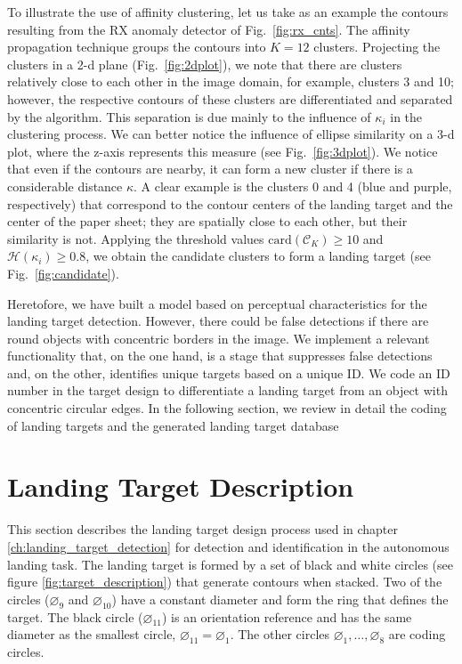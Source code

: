 To illustrate the use of affinity clustering, let us take as an example the contours resulting from the RX anomaly detector of Fig.\ \ref{fig:rx_cnts}. The affinity propagation technique groups the contours into $K=12$ clusters. Projecting the clusters in a 2-d plane (Fig.\ \ref{fig:2dplot}), we note that there are clusters relatively close to each other in the image domain, for example, clusters 3 and 10; however, the respective contours of these clusters are differentiated and separated by the algorithm. This separation is due mainly to the influence of $\kappa_{i}$ in the clustering process. We can better notice the influence of ellipse similarity on a 3-d plot, where the z-axis represents this measure (see Fig.\ \ref{fig:3dplot}). We notice that even if the contours are nearby, it can form a new cluster if there is a considerable distance $\kappa$. A clear example is the clusters 0 and 4 (blue and purple, respectively) that correspond to the contour centers of the landing target and the center of the paper sheet; they are spatially close to each other, but their similarity is not. Applying the threshold values $\mathrm{card}(\mathcal{C}_{K})\geq 10$ and $\mathcal{H}(\kappa_{i})\geq 0.8$, we obtain the candidate clusters to form a landing target (see Fig.\ \ref{fig:candidate}). 

Heretofore, we have built a model based on perceptual characteristics for the landing target detection. However, there could be false detections if there are round objects with concentric borders in the image. We implement a relevant functionality that, on the one hand, is a stage that suppresses false detections and, on the other, identifies unique targets based on a unique ID. We code an ID number in the target design to differentiate a landing target from an object with concentric circular edges. In the following section, we review in detail the coding of landing targets and the generated landing target database

\section{Landing Target Description}\label{ch:target_description}
This section describes the landing target design process used in chapter \ref{ch:landing_target_detection} for detection and identification in the autonomous landing task. The landing target is formed by a set of black and white circles (see figure  \ref{fig:target_description}) that generate contours when stacked. Two of the circles ($\diameter_{9}$ and $\diameter_{10}$) have a constant diameter and form the ring that defines the target. The black circle ($\diameter_{11}$) is an orientation reference and has the same diameter as the smallest circle, $\diameter_{11}=\diameter_{1}$. The other circles $\diameter_{1}, \ldots, \diameter_{8}$ are coding circles.


